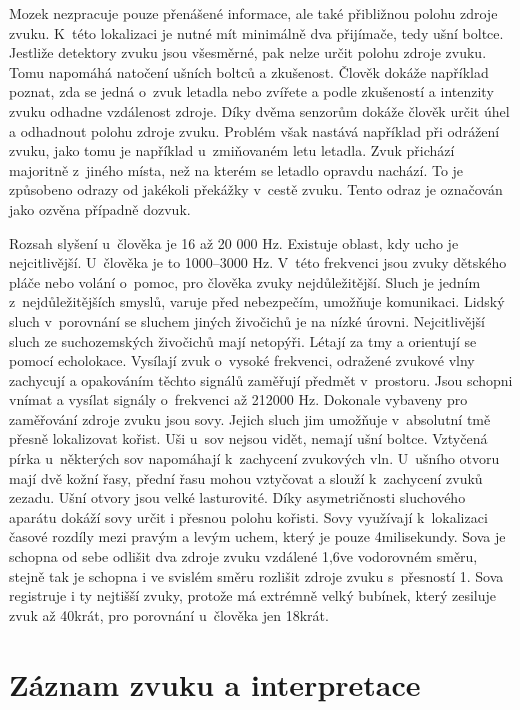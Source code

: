 Mozek nezpracuje pouze přenášené informace, ale také přibližnou polohu zdroje zvuku. K~této lokalizaci je nutné mít minimálně dva přijímače, tedy ušní boltce. Jestliže detektory zvuku jsou všesměrné, pak nelze určit polohu zdroje zvuku. Tomu napomáhá natočení ušních boltců a zkušenost. Člověk dokáže například poznat, zda se jedná o~zvuk letadla nebo zvířete a podle zkušeností a intenzity zvuku odhadne vzdálenost zdroje. Díky dvěma senzorům dokáže člověk určit úhel a odhadnout polohu zdroje zvuku. Problém však nastává například při odrážení zvuku, jako tomu je například u~zmiňovaném letu letadla. Zvuk přichází majoritně z~jiného místa, než na kterém se letadlo opravdu nachází. To je způsobeno odrazy od jakékoli překážky v~cestě zvuku. Tento odraz je označován jako ozvěna případně dozvuk.

Rozsah slyšení u~člověka je 16 až 20 000 Hz. Existuje oblast, kdy ucho je nejcitlivější. U~člověka je to 1000–3000 Hz. V~této frekvenci jsou zvuky dětského pláče nebo volání o~pomoc, pro člověka zvuky nejdůležitější. Sluch je jedním z~nejdůležitějších smyslů, varuje před nebezpečím, umožňuje komunikaci. Lidský sluch v~porovnání se sluchem jiných živočichů je na nízké úrovni. Nejcitlivější sluch ze suchozemských živočichů mají netopýři. Létají za tmy a orientují se pomocí echolokace. Vysílají zvuk o~vysoké frekvenci, odražené zvukové vlny zachycují a opakováním těchto signálů zaměřují předmět v~prostoru.  Jsou schopni vnímat a vysílat signály o~frekvenci až 212000 Hz. Dokonale vybaveny pro zaměřování zdroje zvuku jsou sovy. Jejich sluch jim umožňuje v~absolutní tmě přesně lokalizovat kořist. Uši u~sov nejsou vidět, nemají ušní boltce. Vztyčená pírka u~některých sov napomáhají k~zachycení zvukových vln. U~ušního otvoru mají dvě kožní řasy, přední řasu mohou vztyčovat a slouží k~zachycení zvuků zezadu. Ušní otvory jsou velké lasturovité. Díky asymetričnosti sluchového aparátu dokáží sovy určit i přesnou polohu kořisti. Sovy využívají k~lokalizaci časové rozdíly mezi pravým a levým uchem, který je pouze 4milisekundy. Sova je schopna od sebe odlišit dva zdroje zvuku vzdálené 1,6\degree ve vodorovném směru, stejně tak je schopna i ve svislém směru rozlišit zdroje zvuku s~přesností 1\degree. Sova registruje i ty nejtišší zvuky, protože má extrémně velký bubínek, který zesiluje zvuk až 40krát, pro porovnání u~člověka jen 18krát. \cite{sovy} \cite{zver}

\section{Záznam zvuku a interpretace}

